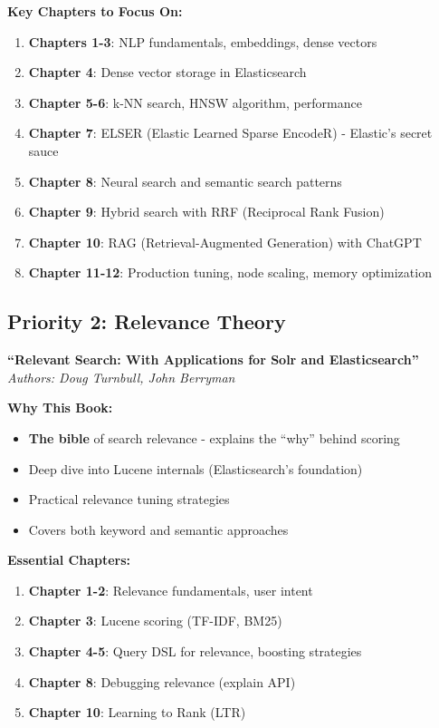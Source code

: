 \documentclass[10pt]{article}
\begin{document}
\textbf{Key Chapters to Focus On:}
\begin{enumerate}
\item \textbf{Chapters 1-3}: NLP fundamentals, embeddings, dense vectors
\item \textbf{Chapter 4}: Dense vector storage in Elasticsearch
\item \textbf{Chapter 5-6}: k-NN search, HNSW algorithm, performance
\item \textbf{Chapter 7}: ELSER (Elastic Learned Sparse EncodeR) - Elastic's secret sauce
\item \textbf{Chapter 8}: Neural search and semantic search patterns
\item \textbf{Chapter 9}: Hybrid search with RRF (Reciprocal Rank Fusion)
\item \textbf{Chapter 10}: RAG (Retrieval-Augmented Generation) with ChatGPT
\item \textbf{Chapter 11-12}: Production tuning, node scaling, memory optimization
\end{enumerate}

\subsection{Priority 2: Relevance Theory}

\textbf{``Relevant Search: With Applications for Solr and Elasticsearch''} \\
\textit{Authors: Doug Turnbull, John Berryman}

\textbf{Why This Book:}
\begin{itemize}[leftmargin=*]
\item \textbf{The bible} of search relevance - explains the ``why'' behind scoring
\item Deep dive into Lucene internals (Elasticsearch's foundation)
\item Practical relevance tuning strategies
\item Covers both keyword and semantic approaches
\end{itemize}

\textbf{Essential Chapters:}
\begin{enumerate}
\item \textbf{Chapter 1-2}: Relevance fundamentals, user intent
\item \textbf{Chapter 3}: Lucene scoring (TF-IDF, BM25)
\item \textbf{Chapter 4-5}: Query DSL for relevance, boosting strategies
\item \textbf{Chapter 8}: Debugging relevance (explain API)
\item \textbf{Chapter 10}: Learning to Rank (LTR)
\end{enumerate}
\end{document}
